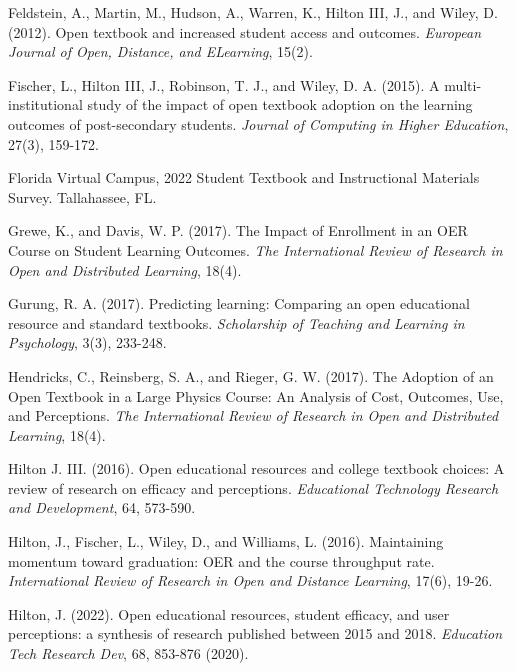 \documentclass[11pt]{article}
\newcommand{\alink}[2]{\href{#1}{\textcolor{blue}{#2}}}
\begin{document}
\begin{thebibliography}{99}
   Feldstein, A., Martin, M., Hudson, A., Warren, K., Hilton III, J., and Wiley, D. (2012). Open textbook and increased student access and outcomes. {\em European Journal of Open, Distance, and ELearning}, 15(2).

   Fischer, L., Hilton III, J., Robinson, T. J., and Wiley, D.
  A. (2015). A multi-institutional study of the impact of open textbook adoption on the learning outcomes of post-secondary students. {\em Journal of Computing in Higher Education}, 27(3), 159-172.

   Florida Virtual Campus, 2022 Student Textbook and Instructional Materials Survey. Tallahassee, FL. %

   Grewe, K., and Davis, W. P. (2017). The Impact of Enrollment in an OER Course on Student Learning Outcomes. {\em The International Review of Research in Open and Distributed Learning}, 18(4).

   Gurung, R. A. (2017). Predicting learning: Comparing an open educational resource and standard textbooks. {\em Scholarship of Teaching and Learning in Psychology}, 3(3), 233-248.

   Hendricks, C., Reinsberg, S. A., and Rieger, G. W. (2017). The Adoption of an Open Textbook in a Large Physics Course: An Analysis of Cost, Outcomes, Use, and Perceptions. {\em The International Review of Research in Open and Distributed Learning}, 18(4).

   Hilton J. III. (2016). Open educational resources and college textbook choices: A review of research on efficacy and perceptions. {\em Educational Technology Research and Development}, 64, 573-590.

   Hilton, J., Fischer, L., Wiley, D., and Williams, L. (2016). Maintaining momentum toward graduation: OER and the course throughput rate. {\em International Review of Research in Open and Distance Learning}, 17(6), 19-26.

   Hilton, J. (2022). Open educational resources, student efficacy, and user perceptions: a synthesis of research published between 2015 and 2018. {\em Education Tech Research Dev}, 68, 853-876 (2020).%


\end{thebibliography}
\end{document}
